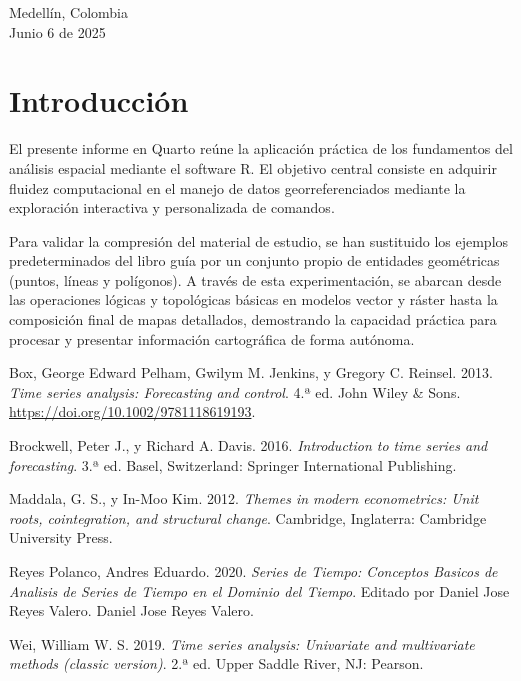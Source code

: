\documentclass[
  12pt,
  letterpaper,
  DIV=11,
  numbers=noendperiod]{scrartcl}
\newlength{\cslhangindent}
\newenvironment{CSLReferences}[2] %
 {\begin{list}{}{%
  \setlength{\itemindent}{0pt}
  \setlength{\leftmargin}{0pt}
  \setlength{\parsep}{0pt}
  \ifodd #1
   \setlength{\leftmargin}{\cslhangindent}
   \setlength{\itemindent}{-1\cslhangindent}
  \fi
  \setlength{\itemsep}{#2\baselineskip}}}
 {\end{list}}
\renewcommand*\contentsname{Tabla de contenidos}
\newcommand\contentsname{Tabla de contenidos}
\begin{document}
\begin{titlepage}
\begin{minipage}{13.5cm}
{\large
Medellín, Colombia
}\\[0.1cm]

{\large
Junio 6 de 2025
}

\end{minipage}

\vfill %

\end{titlepage}





\renewcommand*\contentsname{Índice General}
{
\hypersetup{linkcolor=}
\setcounter{tocdepth}{3}
\tableofcontents
}
\listoffigures
\listoftables
\section{Introducción}\label{introducciuxf3n}

El presente informe en Quarto reúne la aplicación práctica de los
fundamentos del análisis espacial mediante el software R. El objetivo
central consiste en adquirir fluidez computacional en el manejo de datos
georreferenciados mediante la exploración interactiva y personalizada de
comandos.

Para validar la compresión del material de estudio, se han sustituido
los ejemplos predeterminados del libro guía por un conjunto propio de
entidades geométricas (puntos, líneas y polígonos). A través de esta
experimentación, se abarcan desde las operaciones lógicas y topológicas
básicas en modelos vector y ráster hasta la composición final de mapas
detallados, demostrando la capacidad práctica para procesar y presentar
información cartográfica de forma autónoma.

\label{refs}
\begin{CSLReferences}{1}{0}
Box, George Edward Pelham, Gwilym M. Jenkins, y Gregory C. Reinsel.
2013. \emph{Time series analysis: Forecasting and control}. 4.ª ed. John
Wiley \& Sons. \url{https://doi.org/10.1002/9781118619193}.

Brockwell, Peter J., y Richard A. Davis. 2016. \emph{Introduction to
time series and forecasting}. 3.ª ed. Basel, Switzerland: Springer
International Publishing.

Maddala, G. S., y In-Moo Kim. 2012. \emph{Themes in modern econometrics:
Unit roots, cointegration, and structural change}. Cambridge,
Inglaterra: Cambridge University Press.

Reyes Polanco, Andres Eduardo. 2020. \emph{Series de Tiempo: Conceptos
Basicos de Analisis de Series de Tiempo en el Dominio del Tiempo}.
Editado por Daniel Jose Reyes Valero. Daniel Jose Reyes Valero.

Wei, William W. S. 2019. \emph{Time series analysis: Univariate and
multivariate methods (classic version)}. 2.ª ed. Upper Saddle River, NJ:
Pearson.

\end{CSLReferences}
\end{document}
